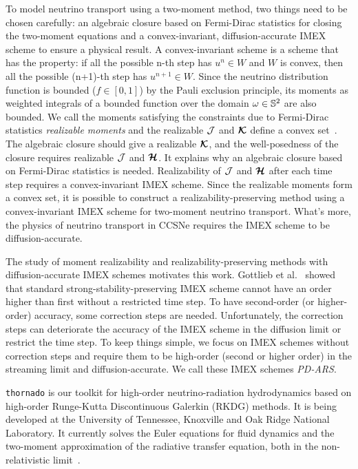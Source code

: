To model neutrino transport using a two-moment method, two things need to be chosen carefully: an algebraic closure based on Fermi-Dirac statistics for closing the two-moment equations and a convex-invariant, diffusion-accurate IMEX scheme to ensure a physical result.
A convex-invariant scheme is a scheme that has the property: if all the possible n-th step has $u^{n}\in W$ and $W$ is convex, then all the possible (n+1)-th step has $u^{n+1}\in W$.
Since the neutrino distribution function is bounded ($f\in[0,1]$) by the Pauli exclusion principle, its moments as weighted integrals of a bounded function over the domain $\omega\in\mathbb{S}^{2}$ are also bounded.
We call the moments satisfying the constraints due to Fermi-Dirac statistics \textit{realizable moments} and the realizable $\mathcal{J}$ and $\boldsymbol{\mathcal{K}}$ define a convex set~\cite{chu_etal_2018}.
The algebraic closure should give a realizable $\boldsymbol{\mathcal{K}}$, and the well-posedness of the closure requires realizable $\mathcal{J}$ and $\boldsymbol{\mathcal{H}}$.
It explains why an algebraic closure based on Fermi-Dirac statistics is needed.
Realizability of $\mathcal{J}$ and $\boldsymbol{\mathcal{H}}$ after each time step requires a convex-invariant IMEX scheme.
Since the realizable moments form a convex set, it is possible to construct a realizability-preserving method using a convex-invariant IMEX scheme for two-moment neutrino transport.
What's more, the physics of neutrino transport in CCSNe requires the IMEX scheme to be diffusion-accurate.

The study of moment realizability and realizability-preserving methods with diffusion-accurate IMEX schemes motivates this work.
Gottlieb et al.~\cite{gottlieb_etal_2001} showed that standard strong-stability-preserving IMEX scheme cannot have an order higher than first without a restricted time step.
To have second-order (or higher-order) accuracy, some correction steps are needed.
Unfortunately, the correction steps can deteriorate the accuracy of the IMEX scheme in the diffusion limit or restrict the time step.
To keep things simple, we focus on IMEX schemes without correction steps and require them to be high-order (second or higher order) in the streaming limit and diffusion-accurate.
We call these IMEX schemes \textit{PD-ARS}.

\texttt{thornado} is our toolkit for high-order neutrino-radiation hydrodynamics based on high-order Runge-Kutta Discontinuous Galerkin (RKDG) methods.
It is being developed at the University of Tennessee, Knoxville and Oak Ridge National Laboratory.
It currently solves the Euler equations for fluid dynamics and the two-moment approximation of the radiative transfer equation, both in the non-relativistic limit~\cite{endeve_etal_2018}.

